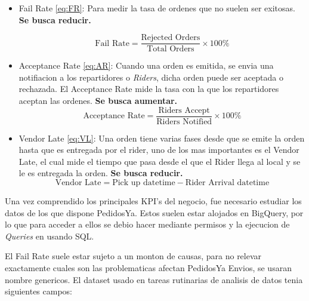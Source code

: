 \begin{itemize}
	\item Fail Rate \eqref{eq:FR}: Para medir la tasa de ordenes que no suelen ser exitosas. \textbf{Se busca reducir.}

	      \begin{equation} \label{eq:FR}
		      \text{Fail Rate} = \frac{\text{Rejected Orders}}{\text{Total Orders}} \times 100\%
	      \end{equation}

	\item Acceptance Rate \eqref{eq:AR}: Cuando una orden es emitida, se envia una notifiacion a los repartidores o \textit{Riders}, dicha orden puede ser aceptada o rechazada. El Acceptance Rate mide la tasa con la que los repartidores aceptan las ordenes. \textbf{Se busca aumentar.}
	      \begin{equation} \label{eq:AR}
		      \text{Acceptance Rate} = \frac{\text{Riders Accept}}{\text{Riders Notified}} \times 100\%
	      \end{equation}
	\item Vendor Late \eqref{eq:VL}: Una orden tiene varias fases desde que se emite la orden hasta que es entregada por el rider, uno de los mas importantes es el Vendor Late, el cual mide el tiempo que pasa desde el que el Rider llega al local y se le es entregada la orden. \textbf{Se busca reducir.}
	      \begin{equation}\label{eq:VL}
		      \text{Vendor Late} = \text{Pick up datetime} - \text{Rider Arrival datetime}
	      \end{equation}
\end{itemize}

Una vez comprendido los principales KPI's del negocio, fue necesario estudiar los datos de los que dispone PedidosYa. Estos suelen estar alojados en BigQuery, por lo que para acceder a ellos se debio hacer mediante permisos y la ejecucion de \textit{Queries} en usando SQL.

El Fail Rate suele estar sujeto a un monton de causas, para no relevar exactamente cuales son las problematicas afectan PedidosYa Envios, se usaran nombre genericos. El dataset usado en tareas rutinarias de analisis de datos tenia siguientes campos:

